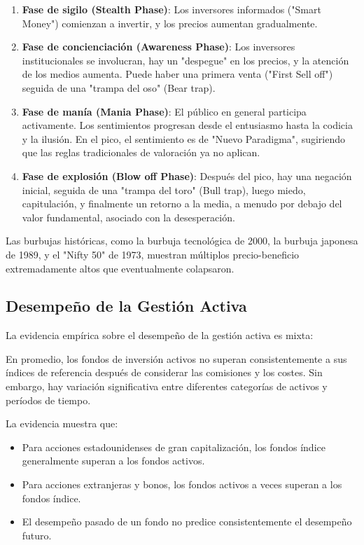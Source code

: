 \begin{enumerate}
\item \textbf{Fase de sigilo (Stealth Phase)}: Los inversores informados ("Smart Money") comienzan a invertir, y los precios aumentan gradualmente.

\item \textbf{Fase de concienciación (Awareness Phase)}: Los inversores institucionales se involucran, hay un "despegue" en los precios, y la atención de los medios aumenta. Puede haber una primera venta ("First Sell off") seguida de una "trampa del oso" (Bear trap).

\item \textbf{Fase de manía (Mania Phase)}: El público en general participa activamente. Los sentimientos progresan desde el entusiasmo hasta la codicia y la ilusión. En el pico, el sentimiento es de "Nuevo Paradigma", sugiriendo que las reglas tradicionales de valoración ya no aplican.

\item \textbf{Fase de explosión (Blow off Phase)}: Después del pico, hay una negación inicial, seguida de una "trampa del toro" (Bull trap), luego miedo, capitulación, y finalmente un retorno a la media, a menudo por debajo del valor fundamental, asociado con la desesperación.
\end{enumerate}

Las burbujas históricas, como la burbuja tecnológica de 2000, la burbuja japonesa de 1989, y el "Nifty 50" de 1973, muestran múltiplos precio-beneficio extremadamente altos que eventualmente colapsaron.

\subsection{Desempeño de la Gestión Activa}

La evidencia empírica sobre el desempeño de la gestión activa es mixta:

\begin{proposicion}
En promedio, los fondos de inversión activos no superan consistentemente a sus índices de referencia después de considerar las comisiones y los costes. Sin embargo, hay variación significativa entre diferentes categorías de activos y períodos de tiempo.
\end{proposicion}

La evidencia muestra que:
\begin{itemize}
\item Para acciones estadounidenses de gran capitalización, los fondos índice generalmente superan a los fondos activos.
\item Para acciones extranjeras y bonos, los fondos activos a veces superan a los fondos índice.
\item El desempeño pasado de un fondo no predice consistentemente el desempeño futuro.
\end{itemize}

